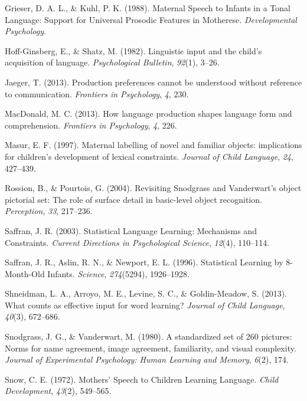 \documentclass[10pt, letterpaper]{article}
\begin{document}
\leavevmode\hypertarget{ref-grieser1988}{}%
Grieser, D. A. L., \& Kuhl, P. K. (1988). Maternal Speech to Infants in
a Tonal Language: Support for Universal Prosodic Features in Motherese.
\emph{Developmental Psychology}.

\leavevmode\hypertarget{ref-hoff-ginsberg1982}{}%
Hoff-Ginsberg, E., \& Shatz, M. (1982). Linguistic input and the child's
acquisition of language. \emph{Psychological Bulletin}, \emph{92}(1),
3--26.

\leavevmode\hypertarget{ref-jaeger2013}{}%
Jaeger, T. (2013). Production preferences cannot be understood without
reference to communication. \emph{Frontiers in Psychology}, \emph{4},
230.

\leavevmode\hypertarget{ref-macdonald2013}{}%
MacDonald, M. C. (2013). How language production shapes language form
and comprehension. \emph{Frontiers in Psychology}, \emph{4}, 226.

\leavevmode\hypertarget{ref-masur1997}{}%
Masur, E. F. (1997). Maternal labelling of novel and familiar objects:
implications for children's development of lexical constraints.
\emph{Journal of Child Language}, \emph{24}, 427--439.

\leavevmode\hypertarget{ref-rossion2004}{}%
Rossion, B., \& Pourtois, G. (2004). Revisiting Snodgrass and
Vanderwart's object pictorial set: The role of surface detail in
basic-level object recognition. \emph{Perception}, \emph{33}, 217--236.

\leavevmode\hypertarget{ref-saffran2003}{}%
Saffran, J. R. (2003). Statistical Language Learning: Mechanisms and
Constraints. \emph{Current Directions in Psychological Science},
\emph{12}(4), 110--114.

\leavevmode\hypertarget{ref-saffran1996}{}%
Saffran, J. R., Aslin, R. N., \& Newport, E. L. (1996). Statistical
Learning by 8-Month-Old Infants. \emph{Science}, \emph{274}(5294),
1926--1928.

\leavevmode\hypertarget{ref-shneidman2013}{}%
Shneidman, L. A., Arroyo, M. E., Levine, S. C., \& Goldin-Meadow, S.
(2013). What counts as effective input for word learning? \emph{Journal
of Child Language}, \emph{40}(3), 672--686.

\leavevmode\hypertarget{ref-snodgrass1980}{}%
Snodgrass, J. G., \& Vanderwart, M. (1980). A standardized set of 260
pictures: Norms for name agreement, image agreement, familiarity, and
visual complexity. \emph{Journal of Experimental Psychology: Human
Learning and Memory}, \emph{6}(2), 174.

\leavevmode\hypertarget{ref-snow1972}{}%
Snow, C. E. (1972). Mothers' Speech to Children Learning Language.
\emph{Child Development}, \emph{43}(2), 549--565.
\end{document}
